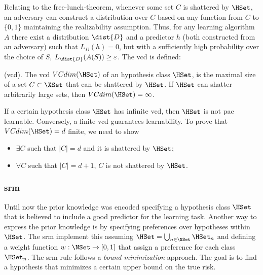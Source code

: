 Relating to the free-lunch-theorem, whenever some set $C$ is shattered
by $\HSet$, an adversary can 
construct a distribution over $C$ based on any function from $C$ to
$\{0,1\}$ maintaining the realizability assumption. Thus, for any
learning algorithm $A$ there exist a distribution $\dist{D}$ and a
predictor $h$
(both constructed from an adversary) such that $L_D(h)=0$, but with a
sufficiently high probability over the choice of $S$,
$L_\dist{D}(A(S))\geq\varepsilon$. The \ac{vcd} is defined:
\begin{definition}
  (\ac{vcd}). The \ac{vcd} $VCdim(\HSet)$ of an hypothesis class
  $\HSet$, is the maximal size of a set $C\subset\XSet$ that can be
  shattered by $\HSet$. If $\HSet$ can shatter arbitrarily large sets,
  then $VCdim(\HSet)=\infty$.
\end{definition}

If a certain hypothesis class $\HSet$ has infinite \ac{vcd}, then
$\HSet$ is not \ac{pac} learnable. Conversely, a finite \ac{vcd}
guarantees learnability. To prove that $VCdim(\HSet)=d$ finite, we
need to show
\begin{itemize}
\item $\exists C$ such that $|C|=d$ and it is shattered by $\HSet$;
\item $\forall C$ such that $|C|=d+1$, $C$ is not shattered by
  $\HSet$. 
\end{itemize}

\subsubsection{\ac{srm}}
Until now the prior knowledge was encoded specifying a hypothesis
class $\HSet$ that is believed to include a good predictor for the
learning task. Another way to express the prior knowledge is by
specifying preferences over hypotheses within $\HSet$. The \ac{srm}
implement this assuming $\HSet=\bigcup_{n\in\NSet}\HSet_n$ and
defining a weight function $w:\NSet\rightarrow[0,1]$ that assign a
preference for each class $\HSet_n$. The \ac{srm} rule follows a
\emph{bound minimization} approach. The goal is to find a hypothesis
that minimizes a certain upper bound on the true risk.
